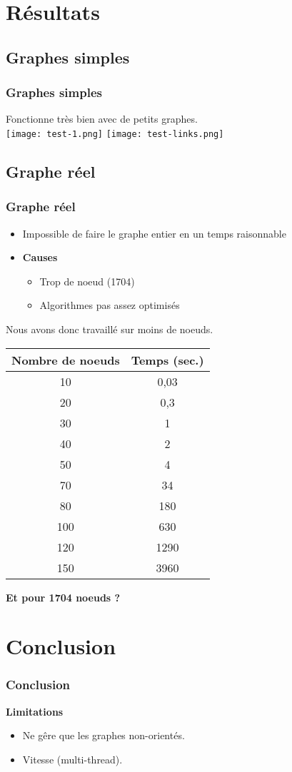 \documentclass{beamer}
\begin{document}
\section{Résultats}
\subsection{Graphes simples}
\begin{frame}
\frametitle{Graphes simples}
Fonctionne très bien avec de petits graphes.\\
\texttt{[image: test-1.png]}\hfill{}
\texttt{[image: test-links.png]}

\end{frame}
\subsection{Graphe réel}
\begin{frame}
\frametitle{Graphe réel}
\begin{itemize}
	\item Impossible de faire le graphe entier en un temps raisonnable\\
	\item \textbf{Causes}
		\begin{itemize}
		\item Trop de noeud (1704)
		\item Algorithmes pas assez optimisés
		\end{itemize}
\end{itemize}
\end{frame}


\begin{frame}
Nous avons donc travaillé sur moins de noeuds.
\begin{center}
\begin{tabular}{|c|c|}
	\hline
	Nombre de noeuds & Temps (sec.) \\
	\hline
	10 & 0,03 \\
	\hline
	20 & 0,3\\
	\hline
	30 & 1\\
	\hline
	40 & 2\\
	\hline
	50 & 4\\
	\hline
	70 & 34\\
	\hline
	80 & 180\\
	\hline
	100 & 630\\
	\hline
	120 & 1290 \\
	\hline
	150 & 3960\\
	\hline
\end{tabular}
\end{center}
\textbf{Et pour 1704 noeuds ?}
\end{frame}

\section{Conclusion}
\begin{frame}
\frametitle{Conclusion}
\textbf{Limitations}
\begin{itemize}
\item Ne gêre que les graphes non-orientés.
\item Vitesse (multi-thread).
\end{itemize}

\end{frame}
\end{document}
